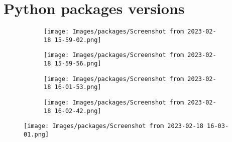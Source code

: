 \section{Python packages versions}
\begin{figure}[H]
                \centering
                \begin{subfigure}[t]{0.49\textwidth}
                    \centering              \texttt{[image: Images/packages/Screenshot from 2023-02-18 15-59-02.png]}
                \end{subfigure}
                \hfill
                \begin{subfigure}[t]{0.49\textwidth}
                    \centering        \texttt{[image: Images/packages/Screenshot from 2023-02-18 15-59-56.png]}
                \end{subfigure}        
            \end{figure}

\begin{figure}[H]
                \centering
                \begin{subfigure}[t]{0.49\textwidth}
                    \centering              \texttt{[image: Images/packages/Screenshot from 2023-02-18 16-01-53.png]}
                \end{subfigure}
                \hfill
                \begin{subfigure}[t]{0.49\textwidth}
                    \centering        \texttt{[image: Images/packages/Screenshot from 2023-02-18 16-02-42.png]}
                \end{subfigure}        
            \end{figure}

\begin{figure}
    \centering
    \texttt{[image: Images/packages/Screenshot from 2023-02-18 16-03-01.png]}
\end{figure}